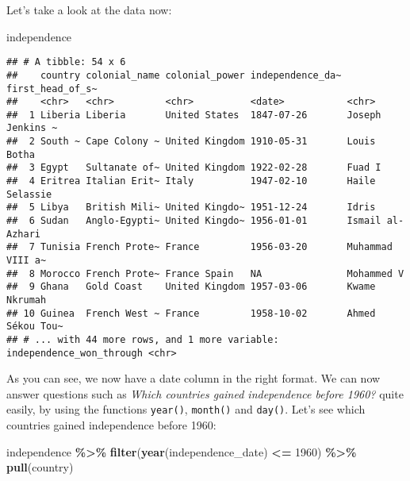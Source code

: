 \documentclass[
]{article}
\newenvironment{Shaded}{\begin{snugshade}}{\end{snugshade}}
\newcommand{\DecValTok}[1]{\textcolor[rgb]{0.00,0.00,0.81}{#1}}
\newcommand{\KeywordTok}[1]{\textcolor[rgb]{0.13,0.29,0.53}{\textbf{#1}}}
\newcommand{\NormalTok}[1]{#1}
\newcommand{\OperatorTok}[1]{\textcolor[rgb]{0.81,0.36,0.00}{\textbf{#1}}}
\newcommand{\StringTok}[1]{\textcolor[rgb]{0.31,0.60,0.02}{#1}}
\begin{document}
Let's take a look at the data now:

\begin{Shaded}
\begin{Highlighting}[]
\NormalTok{independence}
\end{Highlighting}
\end{Shaded}

\begin{verbatim}
## # A tibble: 54 x 6
##    country colonial_name colonial_power independence_da~ first_head_of_s~
##    <chr>   <chr>         <chr>          <date>           <chr>           
##  1 Liberia Liberia       United States  1847-07-26       Joseph Jenkins ~
##  2 South ~ Cape Colony ~ United Kingdom 1910-05-31       Louis Botha     
##  3 Egypt   Sultanate of~ United Kingdom 1922-02-28       Fuad I          
##  4 Eritrea Italian Erit~ Italy          1947-02-10       Haile Selassie  
##  5 Libya   British Mili~ United Kingdo~ 1951-12-24       Idris           
##  6 Sudan   Anglo-Egypti~ United Kingdo~ 1956-01-01       Ismail al-Azhari
##  7 Tunisia French Prote~ France         1956-03-20       Muhammad VIII a~
##  8 Morocco French Prote~ France Spain   NA               Mohammed V      
##  9 Ghana   Gold Coast    United Kingdom 1957-03-06       Kwame Nkrumah   
## 10 Guinea  French West ~ France         1958-10-02       Ahmed Sékou Tou~
## # ... with 44 more rows, and 1 more variable: independence_won_through <chr>
\end{verbatim}

As you can see, we now have a date column in the right format. We can now answer questions such as
\emph{Which countries gained independence before 1960?} quite easily, by using the functions \texttt{year()},
\texttt{month()} and \texttt{day()}. Let's see which countries gained independence before 1960:

\begin{Shaded}
\begin{Highlighting}[]
\NormalTok{independence }\OperatorTok{\%\textgreater{}\%}
\StringTok{  }\KeywordTok{filter}\NormalTok{(}\KeywordTok{year}\NormalTok{(independence\_date) }\OperatorTok{\textless{}=}\StringTok{ }\DecValTok{1960}\NormalTok{) }\OperatorTok{\%\textgreater{}\%}
\StringTok{  }\KeywordTok{pull}\NormalTok{(country)}
\end{Highlighting}
\end{Shaded}
\end{document}
